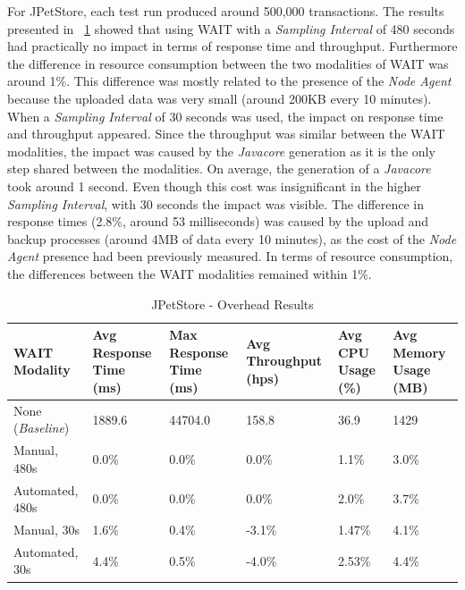 \documentclass[runningheads,a4paper]{llncs}
\begin{document}
For JPetStore, each test run produced around 500,000 transactions. The results
presented in \tablename ~\ref{PetStore1} showed that using WAIT with a
\emph{Sampling Interval} of 480 seconds had practically no impact in terms of
response time and throughput. Furthermore the difference in resource consumption
between the two modalities of WAIT was around 1\%.  This difference was
mostly related to the presence of the \emph{Node Agent} because the uploaded
data was very small (around 200KB every 10 minutes). When a
\emph{Sampling Interval} of 30 seconds was used, the impact on response time
and throughput appeared. Since the throughput was similar between the WAIT
modalities, the impact was caused by the \emph{Javacore} generation as it is
the only step shared between the modalities. On average, the generation of a
\emph{Javacore} took around 1 second. Even though this cost was insignificant in
the higher \emph{Sampling Interval}, with 30 seconds the impact was visible. The
difference in response times (2.8\%, around 53 milliseconds) was caused by the
upload and backup processes (around 4MB of data every 10 minutes), as the cost
of the \emph{Node Agent} presence had been previously measured. In terms of resource 
consumption, the differences between the WAIT modalities remained within 1\%.

\vspace{-5pt}
\begin{table}[!h]
\caption{JPetStore - Overhead Results}
\label{PetStore1}
\centering
\begin{tabular}{p{}|p{}|p{}|p{}|p{}|p{}}
\hline
\bfseries WAIT Modality & \bfseries Avg Response Time (ms)& \bfseries Max
Response Time (ms)& \bfseries Avg Throughput (hps)& \bfseries Avg CPU Usage
(\%) & \bfseries Avg Memory Usage (MB)\\
\hline
None (\emph{Baseline}) 	& 1889.6	& 44704.0	& 158.8 	& 36.9 		& 1429\\
Manual, 480s 			& 0.0\% 	& 0.0\%		& 0.0\%		& 1.1\% 	& 3.0\%\\
Automated, 480s 		& 0.0\%		& 0.0\%		& 0.0\% 	& 2.0\% 	& 3.7\%\\
Manual, 30s 			& 1.6\%		& 0.4\%		& -3.1\% 	& 1.47\% 	& 4.1\%\\
Automated, 30s 			& 4.4\%		& 0.5\%		& -4.0\% 	& 2.53\% 	& 4.4\%\\
\hline
\end{tabular}
\end{table}
\vspace{-5pt}
\end{document}

